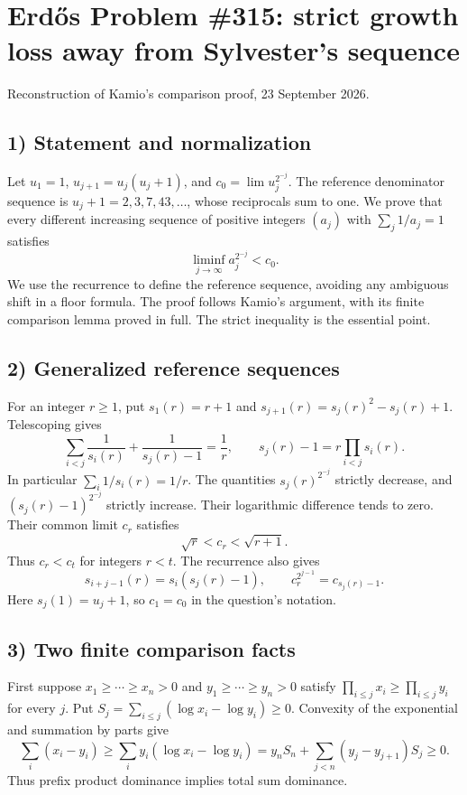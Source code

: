 \section{Erd\H{o}s Problem \#315: strict growth loss away from Sylvester's sequence}
\noindent Reconstruction of Kamio's comparison proof, 23 September 2026.

\subsection*{1) Statement and normalization}
Let $u_1=1$, $u_{j+1}=u_j(u_j+1)$, and $c_0=\lim u_j^{2^{-j}}$. The reference denominator sequence is $u_j+1=2,3,7,43,\ldots$, whose reciprocals sum to one. We prove that every different increasing sequence of positive integers $(a_j)$ with $\sum_j1/a_j=1$ satisfies
\[
 \liminf_{j\to\infty}a_j^{2^{-j}}<c_0.
\]
We use the recurrence to define the reference sequence, avoiding any ambiguous shift in a floor formula. The proof follows Kamio's argument, with its finite comparison lemma proved in full. The strict inequality is the essential point.

\subsection*{2) Generalized reference sequences}
For an integer $r\ge1$, put $s_1(r)=r+1$ and $s_{j+1}(r)=s_j(r)^2-s_j(r)+1$. Telescoping gives
\[
 \sum_{i<j}\frac1{s_i(r)}+\frac1{s_j(r)-1}=\frac1r,
 \qquad s_j(r)-1=r\prod_{i<j}s_i(r).\tag{1}
\]
In particular $\sum_i1/s_i(r)=1/r$. The quantities $s_j(r)^{2^{-j}}$ strictly decrease, and $(s_j(r)-1)^{2^{-j}}$ strictly increase. Their logarithmic difference tends to zero. Their common limit $c_r$ satisfies
\[
 \sqrt r<c_r<\sqrt{r+1}.
\]
Thus $c_r<c_t$ for integers $r<t$. The recurrence also gives
\[
 s_{i+j-1}(r)=s_i(s_j(r)-1),\qquad
 c_r^{2^{j-1}}=c_{s_j(r)-1}.\tag{2}
\]
Here $s_j(1)=u_j+1$, so $c_1=c_0$ in the question's notation.

\subsection*{3) Two finite comparison facts}
First suppose $x_1\ge\cdots\ge x_n>0$ and $y_1\ge\cdots\ge y_n>0$ satisfy $\prod_{i\le j}x_i\ge\prod_{i\le j}y_i$ for every $j$. Put $S_j=\sum_{i\le j}(\log x_i-\log y_i)\ge0$. Convexity of the exponential and summation by parts give
\[
 \sum_i(x_i-y_i)\ge\sum_i y_i(\log x_i-\log y_i)
 =y_nS_n+\sum_{j<n}(y_j-y_{j+1})S_j\ge0.\tag{3}
\]
Thus prefix product dominance implies total sum dominance.

